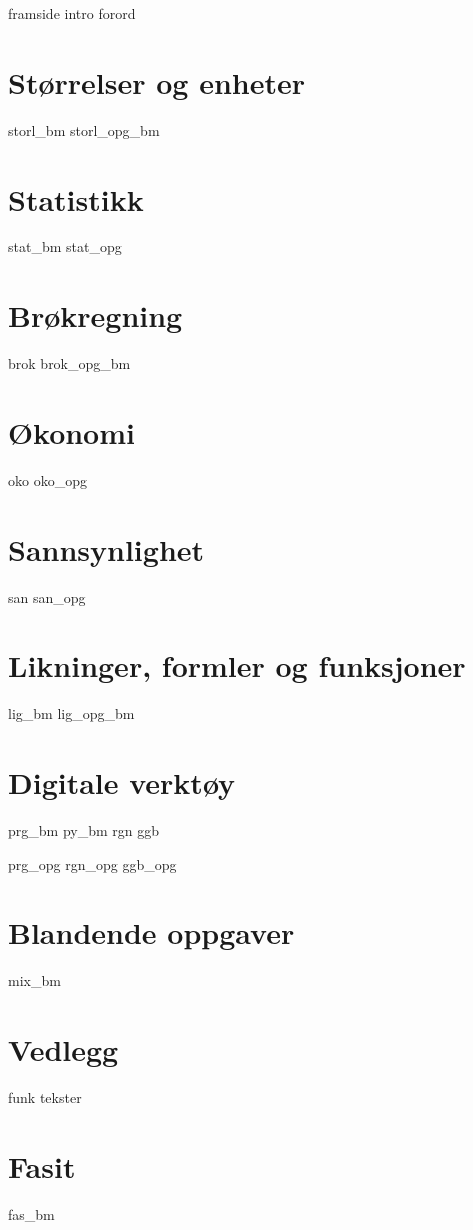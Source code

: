 




{framside}
{intro}
{forord}

\tableofcontents

\chapter{Størrelser og enheter \label{Storlogenh}}
\newpage
{storl_bm}
{storl_opg_bm}

\chapter{Statistikk \label{Statistikk}}
\newpage
{stat_bm}
{stat_opg}

\chapter{Brøkregning \label{BrokAM}}
\newpage
{brok}
\newpage
{brok_opg_bm}

\chapter{Økonomi \label{Okonomi}}
\newpage
{oko}
{oko_opg}

\chapter{Sannsynlighet \label{Sannsyn}} 
\newpage
{san}
{san_opg}

\chapter{Likninger, formler og funksjoner \label{LigningerAM}}
\newpage
{lig_bm}
{lig_opg_bm}

\chapter{Digitale verktøy \label{Dig}}
{prg_bm}
{py_bm}
{rgn}	
{ggb}	

{prg_opg}
{rgn_opg}	
{ggb_opg}	

\chapter{Blandende oppgaver}
{mix_bm}

\chapter*{Vedlegg} 
\newpage
{}
{funk}
{tekster}

\chapter*{Fasit}
{fas_bm}







